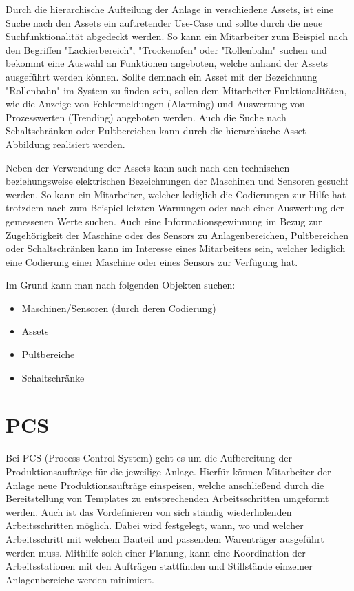 Durch die hierarchische Aufteilung der Anlage in verschiedene Assets, ist eine Suche nach den Assets ein auftretender Use-Case und sollte durch die neue Suchfunktionalität abgedeckt werden. So kann ein Mitarbeiter zum Beispiel nach den Begriffen "Lackierbereich", "Trockenofen" oder "Rollenbahn" suchen und bekommt eine Auswahl an Funktionen angeboten, welche anhand der Assets ausgeführt werden können. Sollte demnach ein Asset mit der Bezeichnung "Rollenbahn" im System zu finden sein, sollen dem Mitarbeiter Funktionalitäten, wie die Anzeige von Fehlermeldungen (Alarming) und Auswertung von Prozesswerten (Trending) angeboten werden. Auch die Suche nach Schaltschränken oder Pultbereichen kann durch die hierarchische Asset Abbildung realisiert werden.

Neben der Verwendung der Assets kann auch nach den technischen beziehungsweise elektrischen Bezeichnungen der Maschinen und Sensoren gesucht werden. So kann ein Mitarbeiter, welcher lediglich die Codierungen zur Hilfe hat trotzdem nach zum Beispiel letzten Warnungen oder nach einer Auswertung der gemessenen Werte suchen. Auch eine Informationsgewinnung im Bezug zur Zugehörigkeit der Maschine oder des Sensors zu Anlagenbereichen, Pultbereichen oder Schaltschränken kann im Interesse eines Mitarbeiters sein, welcher lediglich eine Codierung einer Maschine oder eines Sensors zur Verfügung hat.

Im Grund kann man nach folgenden Objekten suchen:

\begin{itemize}
    \item Maschinen/Sensoren (durch deren Codierung)
    \item Assets
    \item Pultbereiche
    \item Schaltschränke
\end{itemize}

\section{PCS\label{sec3.2:unterpunkt-2}}
Bei PCS (Process Control System) geht es um die Aufbereitung der Produktionsaufträge für die jeweilige Anlage. Hierfür können Mitarbeiter der Anlage neue Produktionsaufträge einspeisen, welche anschließend durch die Bereitstellung von Templates zu entsprechenden Arbeitsschritten umgeformt werden. Auch ist das Vordefinieren von sich ständig wiederholenden Arbeitsschritten möglich. Dabei wird festgelegt, wann, wo und welcher Arbeitsschritt mit welchem Bauteil und passendem Warenträger ausgeführt werden muss. Mithilfe solch einer Planung, kann eine Koordination der Arbeitsstationen mit den Aufträgen stattfinden und Stillstände einzelner Anlagenbereiche werden minimiert.

